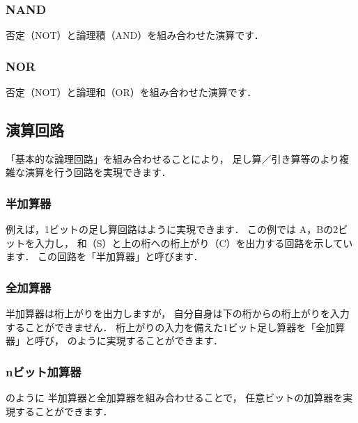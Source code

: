 \subsubsection{NAND}
否定（NOT）と論理積（AND）を組み合わせた演算です．
\begin{center}
\end{center}

\subsubsection{NOR}
否定（NOT）と論理和（OR）を組み合わせた演算です．
\begin{center}
\end{center}

\subsection{演算回路}
「基本的な論理回路」を組み合わせることにより，
足し算／引き算等のより複雑な演算を行う回路を実現できます．

\subsubsection{半加算器}
例えば，1ビットの足し算回路はように実現できます．
この例では A，Bの2ビットを入力し，
和（S）と上の桁への桁上がり（C）を出力する回路を示しています．
この回路を「半加算器」と呼びます．


\subsubsection{全加算器}
半加算器は桁上がりを出力しますが，
自分自身は下の桁からの桁上がりを入力することができません．
桁上がりの入力を備えた1ビット足し算器を「全加算器」と呼び，
のように実現することができます．


\subsubsection{nビット加算器}
のように
半加算器と全加算器を組み合わせることで，
任意ビットの加算器を実現することができます．


